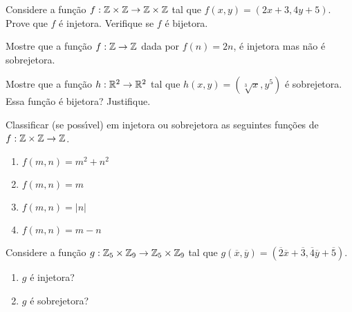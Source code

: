 \documentclass[12pt]{exam}
\begin{document}
    \vspace{.3cm}

    \questao{} Considere a fun{\c c}{\~a}o $f : \mathbb{Z} \times \mathbb{Z} \to \mathbb{Z} \times \mathbb{Z}$ tal que $f(x,y) = (2x + 3, 4y + 5)$. Prove que $f$ {\'e} injetora. Verifique se $f$ {\'e} bijetora.

    \vspace{.3cm}

    \questao{} Mostre que a fun\c{c}\~ao $f : \mathbb{Z} \to \mathbb{Z}$ dada por $f(n) = 2n$, \'e injetora mas n\~ao \'e sobrejetora.

    \vspace{.3cm}

    \questao{} Mostre que a fun\c{c}\~ao $h : \mathbb{R}^2 \to \mathbb{R}^2$ tal que $h(x, y) = (\sqrt[3]{x}, y^5)$ \'e sobrejetora. Essa função é bijetora? Justifique.

    \vspace{.3cm}

    \questao{} Classificar (se poss{\'\i}vel) em injetora ou sobrejetora as seguintes fun{\c c}{\~o}es de $f : \mathbb{Z} \times \mathbb{Z} \to \mathbb{Z}$.

    \begin{multicols}{2}
        \begin{enumerate}[label={\alph*})]
            \item $f(m, n) = m^2 + n^2$

            \item $f(m, n) = m$

            \item $f(m, n) = |n|$

            \item $f(m, n) = m - n$
        \end{enumerate}
    \end{multicols}

    \vspace{.3cm}

    \questao{} Considere a fun{\c c}{\~a}o $g : \mathbb{Z}_5 \times \mathbb{Z}_9 \to \mathbb{Z}_5 \times \mathbb{Z}_9$ tal que $g(\overline{x},\overline{y}) = (\overline{2} \overline{x} + \overline{3}, \overline{4}\overline{y} + \overline{5})$.
    \begin{enumerate}[label={\alph*})]
        \item $g$ \'e injetora?

        \item $g$ \'e sobrejetora?
    \end{enumerate}

    \vspace{.3cm}
\end{document}

